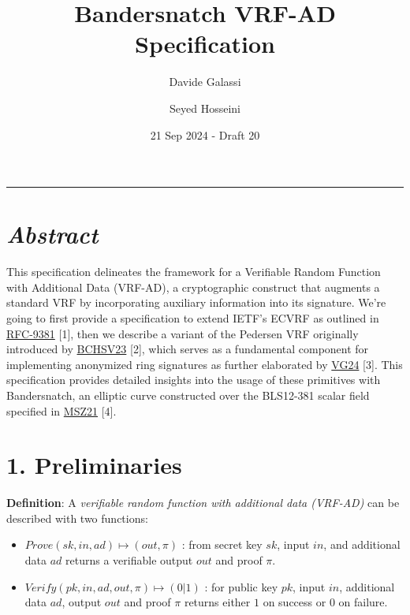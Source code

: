 \documentclass[
]{article}
\title{Bandersnatch VRF-AD Specification}
\author{Davide Galassi \and Seyed Hosseini}
\date{21 Sep 2024 - Draft 20}
\begin{document}
\maketitle

\newcommand{\G}{\langle G \rangle}
\newcommand{\F}{\mathbb{Z}^*_r}

\begin{center}\rule{0.5\linewidth}{0.5pt}\end{center}

\hypertarget{abstract}{%
\section{\texorpdfstring{\emph{Abstract}}{Abstract}}\label{abstract}}

This specification delineates the framework for a Verifiable Random
Function with Additional Data (VRF-AD), a cryptographic construct that
augments a standard VRF by incorporating auxiliary information into its
signature. We're going to first provide a specification to extend IETF's
ECVRF as outlined in
\href{https://datatracker.ietf.org/doc/rfc9381}{RFC-9381} {[}1{]}, then
we describe a variant of the Pedersen VRF originally introduced by
\href{https://eprint.iacr.org/2023/002}{BCHSV23} {[}2{]}, which serves
as a fundamental component for implementing anonymized ring signatures
as further elaborated by
\href{https://github.com/davxy/ring-proof-spec}{VG24} {[}3{]}. This
specification provides detailed insights into the usage of these
primitives with Bandersnatch, an elliptic curve constructed over the
BLS12-381 scalar field specified in
\href{https://eprint.iacr.org/2021/1152}{MSZ21} {[}4{]}.

\hypertarget{preliminaries}{%
\section{1. Preliminaries}\label{preliminaries}}

\textbf{Definition}: A \emph{verifiable random function with additional
data (VRF-AD)} can be described with two functions:

\begin{itemize}
\item
  \(Prove(sk,in,ad) \mapsto (out,\pi)\) : from secret key \(sk\), input
  \(in\), and additional data \(ad\) returns a verifiable output \(out\)
  and proof \(\pi\).
\item
  \(Verify(pk,in,ad,out,\pi) \mapsto (0|1)\) : for public key \(pk\),
  input \(in\), additional data \(ad\), output \(out\) and proof \(\pi\)
  returns either \(1\) on success or \(0\) on failure.
\end{itemize}
\end{document}
